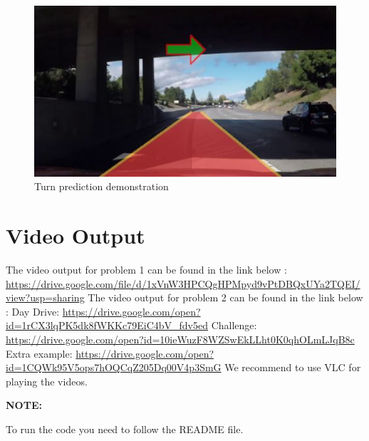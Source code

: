 \documentclass[12pt]{report}
\begin{document}
{\begin{figure}[h!]
    \centering
    \includegraphics[scale=1.0]{TurnPrediction.JPG}
    \caption{Turn prediction demonstration}
    \label{fig:my_label2}
\end{figure}

\section*{Video Output}
The video output for problem 1  can be found in the link below :  \newline
\vspace{3mm}
\url{https://drive.google.com/file/d/1xVnW3HPCQgHPMpyd9vPtDBQxUYa2TQEI/view?usp=sharing} \newline\vspace{3mm}
The video output for problem 2  can be found in the link below :  \newline
\vspace{3mm}
Day Drive: \url{https://drive.google.com/open?id=1rCX3lqPK5dk8fWKKc79EiC4bV_fdv5ed}\newline
Challenge: \url{https://drive.google.com/open?id=10ieWuzF8WZSwEkLLht0K0qhOLmLJqB8c}\newline
Extra example: \url{https://drive.google.com/open?id=1CQWk95V5ops7hOQCqZ205Dq00V4p3SmG}\newline\vspace{3mm}
We recommend to use VLC for playing the videos. \newline 

{\fontsize{14pt}{16.8pt}\selectfont \textbf{NOTE: }\par}\par

To run the code you need to follow the README file.\par



}
\end{document}

